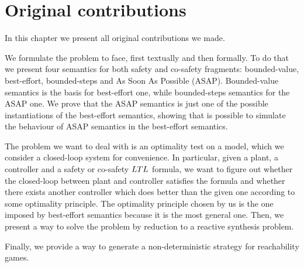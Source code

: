 
\chapter{Original contributions} \label{chapt:original-contributions}

In this chapter we present all original contributions we made.

We formulate the problem to face, first textually and then formally. To do that we present four semantics for both safety and co-safety fragments: bounded-value, best-effort, bounded-steps and As Soon As Possible (ASAP).
Bounded-value semantics is the basis for best-effort one, while bounded-steps semantics for the ASAP one.
We prove that the ASAP semantics is just one of the possible instantiations of the best-effort semantics, showing that is possible to simulate the behaviour of ASAP semantics in the best-effort semantics.

The problem we want to deal with is an optimality test on a model, which we consider a closed-loop system for convenience.
In particular, given a plant, a controller and a safety or co-safety $LTL$ formula, we want to figure out whether the closed-loop between plant and controller satisfies the formula and whether there exists another controller which does better than the given one according to some optimality principle. 
The optimality principle chosen by us is the one imposed by best-effort semantics because it is the most general one.
Then, we present a way to solve the problem by reduction to a reactive synthesis problem.

Finally, we provide a way to generate a non-deterministic strategy for reachability games.






